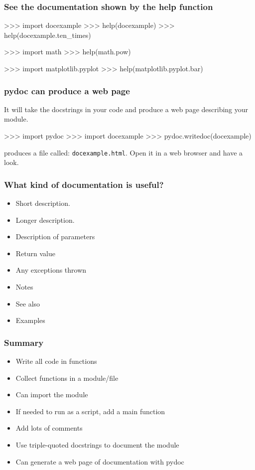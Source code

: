 \documentclass{beamer}
\begin{document}
\begin{frame}[fragile]
\frametitle{See the documentation shown by the help function}
\begin{code}
>>> import docexample
>>> help(docexample)
>>> help(docexample.ten_times)

>>> import math
>>> help(math.pow)

>>> import matplotlib.pyplot
>>> help(matplotlib.pyplot.bar)
\end{code}
\end{frame}

\begin{frame}[fragile]
\frametitle{pydoc can produce a web page}
It will take the docstrings in your code and produce a web page
describing your module.
\begin{code}
>>> import pydoc
>>> import docexample
>>> pydoc.writedoc(docexample)
\end{code}
produces a file called:
\texttt{docexample.html}. Open it in a web browser and have a look.
\end{frame}

\begin{frame}[fragile]
\frametitle{What kind of documentation is useful?}
\begin{itemize}
\item Short description.
\item Longer description.
\item Description of parameters
\item Return value
\item Any exceptions thrown
\item Notes
\item See also
\item Examples
\end{itemize}
\end{frame}

\begin{frame}[fragile]
\frametitle{Summary}
\begin{itemize}
\item Write all code in functions
\item Collect functions in a module/file
\item Can import the module 
\item If needed to run as a script, add a main function
\item Add lots of comments
\item Use triple-quoted docstrings to document the module
\item Can generate a web page of documentation with pydoc
\end{itemize}
\end{frame}
\end{document}
